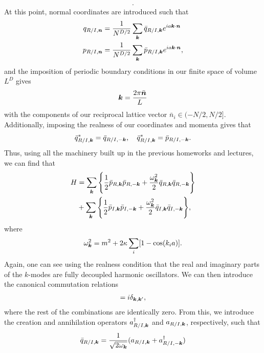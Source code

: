 {\begin{align}
.\end{align}
At this point, normal coordinates are introduced such that
\begin{align}
    q_{R/I,\vb*{n}} &= \frac{1}{N^{D/2}} \sum_{\vb*{k}} \bar{q}_{R/I,\vb*{k}} e^{i a \vb*{k} \cdot \vb*{n}} \\
    p_{R/I,\vb*{n}} &= \frac{1}{N^{D/2}} \sum_{\vb*{k}} \bar{p}_{R/I,\vb*{k}} e^{i a \vb*{k} \cdot \vb*{n}}
,\end{align}
and the imposition of periodic boundary conditions in our finite space of volume $L^{D}$ gives
\begin{align}
    \vb*{k} = \frac{2 \pi \bar{\vb*{n}}}{L}
\end{align}
with the components of our reciprocal lattice vector $\bar{n}_{i} \in (-N/2,N/2]$.
Additionally, imposing the realness of our coordinates and momenta gives that
\begin{align}
    \bar{q}_{R/I,\vb*{k}}^{*} = \bar{q}_{R/I,-\vb*{k}}, \quad \bar{q}_{R/I,\vb*{k}}^{*} = \bar{p}_{R/I,-\vb*{k}}
.\end{align}
Thus, using all the machinery built up in the previous homeworks and lectures, we can find that
\begin{align}
    H &= \sum_{\vb*{k}} \Bigg\{ \frac{1}{2} \bar{p}_{R,\vb*{k}} \bar{p}_{R,-\vb*{k}} + \frac{\omega_{\vb*{k}}^2}{2} \bar{q}_{R,\vb*{k}} \bar{q}_{R,-\vb*{k}} \Bigg\} \nonumber \\
    &+ \sum_{\vb*{k}} \Bigg\{ \frac{1}{2} \bar{p}_{I,\vb*{k}} \bar{p}_{I,-\vb*{k}} + \frac{\omega_{\vb*{k}}^2}{2} \bar{q}_{I,\vb*{k}} \bar{q}_{I,-\vb*{k}} \Bigg\}
,\end{align}
where
\begin{align}
    \omega_{\vb*{k}}^2 = m^2 + 2 \kappa \sum_{i} [ 1 - \cos(k_{i} a) ]
.\end{align}
Again, one can see using the realness condition that the real and imaginary parts of the $k$-modes are fully decoupled harmonic oscillators.
We can then introduce the canonical commutation relations
\begin{align}
    [\bar{q}_{R/I,\vb*{k}},\bar{p}_{R/I,-\vb*{k}'}] = i \delta_{\vb*{k},\vb*{k}'}
,\end{align}
where the rest of the combinations are identically zero.
From this, we introduce the creation and annihilation operators $a_{R/I,\vb*{k}}^{\dagger}$ and $a_{R/I,\vb*{k}}$, respectively, such that
\begin{align}
    \bar{q}_{R/I,\vb*{k}} = \frac{1}{\sqrt{2 \omega_{\vb*{k}}}} ( a_{R/I,\vb*{k}} + a_{R/I,-\vb*{k}}^{\dagger} ) \\

\end{align}}
